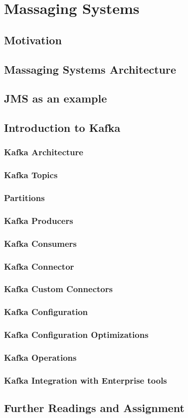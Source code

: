\section{Massaging Systems}
\subsection{Motivation}
\subsection{Massaging Systems Architecture}
\subsection{JMS as an example}
\subsection{Introduction to Kafka}
\subsubsection{Kafka Architecture}
\subsubsection{Kafka Topics}
\subsubsection{Partitions}
\subsubsection{Kafka Producers}
\subsubsection{Kafka Consumers}
\subsubsection{Kafka Connector}
\subsubsection{Kafka Custom Connectors}
\subsubsection{Kafka Configuration}
\subsubsection{Kafka Configuration Optimizations}
\subsubsection{Kafka Operations}
\subsubsection{Kafka Integration with Enterprise tools}%
\subsection{Further Readings and Assignment}